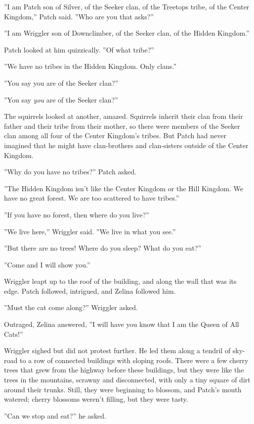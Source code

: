 \documentclass[12pt]{book}
\begin{document}
''I am Patch son of Silver, of the Seeker clan, of the Treetops tribe, of the Center Kingdom,'' Patch said. ''Who are you that asks?''

''I am Wriggler son of Downclimber, of the Seeker clan, of the Hidden Kingdom.''

Patch looked at him quizzically. ''Of what tribe?''

''We have no tribes in the Hidden Kingdom. Only clans.''

''You say you are of the Seeker clan?''

''You say {\it you} are of the Seeker clan?''

The squirrels looked at another, amazed. Squirrels inherit their clan from their father and their tribe from their mother, so there were members of the Seeker clan among all four of the Center Kingdom's tribes. But Patch had never imagined that he might have clan-brothers and clan-sisters outside of the Center Kingdom.

''Why do you have no tribes?'' Patch asked.

''The Hidden Kingdom isn't like the Center Kingdom or the Hill Kingdom. We have no great forest. We are too scattered to have tribes.''

''If you have no forest, then where do you live?''

''We live here,'' Wriggler said. ''We live in what you see.''

''But there are no trees! Where do you sleep? What do you eat?''

''Come and I will show you.''

Wriggler leapt up to the roof of the building, and along the wall that was its edge. Patch followed, intrigued, and Zelina followed him.

''Must the cat come along?'' Wriggler asked.

Outraged, Zelina answered, ''I will have you know that I am the Queen of All Cats!''

Wriggler sighed but did not protest further. He led them along a tendril of sky-road to a row of connected buildings with sloping roofs. There were a few cherry trees that grew from the highway before these buildings, but they were like the trees in the mountains, scrawny and disconnected, with only a tiny square of dirt around their trunks. Still, they were beginning to blossom, and Patch's mouth watered; cherry blossoms weren't filling, but they were tasty.

''Can we stop and eat?'' he asked.
\end{document}
